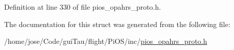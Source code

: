 Definition at line 330 of file pios\-\_\-opahrs\-\_\-proto.\-h.



The documentation for this struct was generated from the following file\-:\begin{DoxyCompactItemize}
\item 
/home/jose/\-Code/gui\-Tau/flight/\-Pi\-O\-S/inc/\hyperlink{pios__opahrs__proto_8h}{pios\-\_\-opahrs\-\_\-proto.\-h}\end{DoxyCompactItemize}
